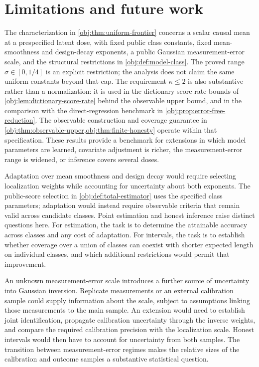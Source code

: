 \section{Limitations and future work}

The characterization in \cref{obj:thm:uniform-frontier} concerns a scalar causal mean at a prespecified latent dose, with fixed public class constants, fixed mean-smoothness and design-decay exponents, a public Gaussian measurement-error scale, and the structural restrictions in \cref{obj:def:model-class}. The proved range \(\sigma\in[0,1/4]\) is an explicit restriction; the analysis does not claim the same uniform constants beyond that cap. The requirement \(\kappa\le2\) is also substantive rather than a normalization: it is used in the dictionary score-rate bounds of \cref{obj:lem:dictionary-score-rate} behind the observable upper bound, and in the comparison with the direct-regression benchmark in \cref{obj:prop:error-free-reduction}. The observable construction and coverage guarantee in \cref{obj:thm:observable-upper,obj:thm:finite-honesty} operate within that specification. These results provide a benchmark for extensions in which model parameters are learned, covariate adjustment is richer, the measurement-error range is widened, or inference covers several doses.

Adaptation over mean smoothness and design decay would require selecting localization weights while accounting for uncertainty about both exponents. The public-score selection in \cref{obj:def:total-estimator} uses the specified class parameters; adaptation would instead require observable criteria that remain valid across candidate classes. Point estimation and honest inference raise distinct questions here. For estimation, the task is to determine the attainable accuracy across classes and any cost of adaptation. For intervals, the task is to establish whether coverage over a union of classes can coexist with shorter expected length on individual classes, and which additional restrictions would permit that improvement.

An unknown measurement-error scale introduces a further source of uncertainty into Gaussian inversion. Replicate measurements or an external calibration sample could supply information about the scale, subject to assumptions linking those measurements to the main sample. An extension would need to establish joint identification, propagate calibration uncertainty through the inverse weights, and compare the required calibration precision with the localization scale. Honest intervals would then have to account for uncertainty from both samples. The transition between measurement-error regimes makes the relative sizes of the calibration and outcome samples a substantive statistical question.

